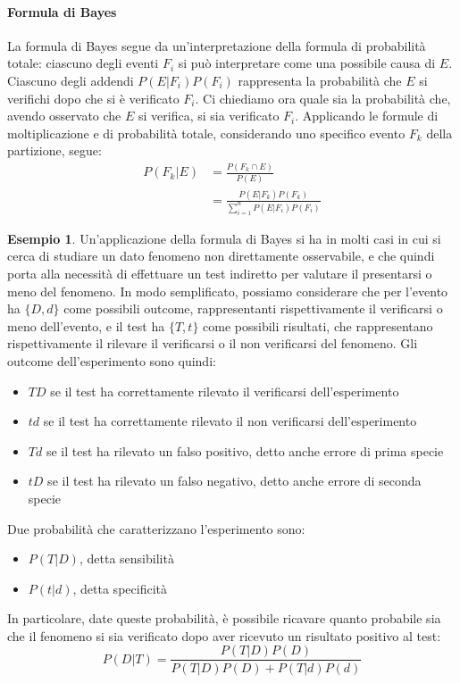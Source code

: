 \documentclass{article}
\theoremstyle{plain}
\theoremstyle{definition}
\newtheorem{esempio}{Esempio}[section]
\theoremstyle{remark}
\begin{document}
\paragraph{Formula di Bayes} %
\label{par:formula_di_bayes}
La formula di Bayes segue da un'interpretazione della formula di probabilità totale: ciascuno degli eventi $F_i$ si può interpretare come una possibile causa di $E$. Ciascuno degli addendi $P(E|F_i)P(F_i)$ rappresenta la probabilità che $E$ si verifichi dopo che si è verificato $F_i$. Ci chiediamo ora quale sia la probabilità che, avendo osservato che $E$ si verifica, si sia verificato $F_i$. Applicando le formule di moltiplicazione e di probabilità totale, considerando uno specifico evento $F_k$ della partizione, segue:
\begin{align*}
	P(F_k|E)&=\frac{P(F_k\cap E)}{P(E)}\\
&=\frac{P(E|F_k)P(F_k)}{\sum_{i=1}^n P(E|F_i)P(F_i)}
\end{align*}
\begin{esempio}
	Un'applicazione della formula di Bayes si ha in molti casi in cui si cerca di studiare un dato fenomeno non direttamente osservabile, e che quindi porta alla necessità di effettuare un test indiretto per valutare il presentarsi o meno del fenomeno. In modo semplificato, possiamo considerare che per l'evento ha $\{D,d\}$ come possibili outcome, rappresentanti rispettivamente il verificarsi o meno dell'evento, e il test ha $\{T,t\}$ come possibili risultati, che rappresentano rispettivamente il rilevare il verificarsi o il non verificarsi del fenomeno. Gli outcome dell'esperimento sono quindi:
	\begin{itemize}
		\item $TD$ se il test ha correttamente rilevato il verificarsi dell'esperimento
		\item $td$ se il test ha correttamente rilevato il non verificarsi dell'esperimento
		\item $Td$ se il test ha rilevato un falso positivo, detto anche errore di prima specie
		\item $tD$ se il test ha rilevato un falso negativo, detto anche errore di seconda specie
	\end{itemize}
	Due probabilità che caratterizzano l'esperimento sono:
	\begin{itemize}
		\item $P(T|D)$, detta sensibilità
		\item $P(t|d)$, detta specificità
	\end{itemize}
	In particolare, date queste probabilità, è possibile ricavare quanto probabile sia che il fenomeno si sia verificato dopo aver ricevuto un risultato positivo al test:
	\begin{equation*}
		P(D|T)=\frac{P(T|D)P(D)}{P(T|D)P(D)+P(T|d)P(d)}%
	\end{equation*}
\end{esempio}
\end{document}
